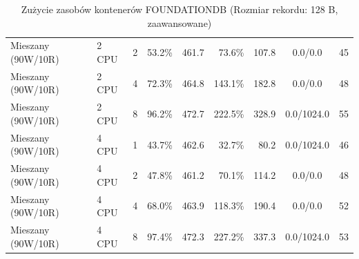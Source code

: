 \begin{table}[ht]
{\begin{tabular}{llcrrrrcc}
Mieszany (90W/10R) & 2 CPU & 2 & 53.2\% & 461.7 & 73.6\% & 107.8 & 0.0/0.0 & 45 \\
Mieszany (90W/10R) & 2 CPU & 4 & 72.3\% & 464.8 & 143.1\% & 182.8 & 0.0/0.0 & 48 \\
Mieszany (90W/10R) & 2 CPU & 8 & 96.2\% & 472.7 & 222.5\% & 328.9 & 0.0/1024.0 & 55 \\
Mieszany (90W/10R) & 4 CPU & 1 & 43.7\% & 462.6 & 32.7\% & 80.2 & 0.0/1024.0 & 46 \\
Mieszany (90W/10R) & 4 CPU & 2 & 47.8\% & 461.2 & 70.1\% & 114.2 & 0.0/0.0 & 48 \\
Mieszany (90W/10R) & 4 CPU & 4 & 68.0\% & 463.9 & 118.3\% & 190.4 & 0.0/0.0 & 52 \\
Mieszany (90W/10R) & 4 CPU & 8 & 97.4\% & 472.3 & 227.2\% & 337.3 & 0.0/1024.0 & 53 \\
\bottomrule
\end{tabular}%
}
\caption{Zużycie zasobów kontenerów FOUNDATIONDB (Rozmiar rekordu: 128 B, zaawansowane)}
\label{tab:resources_foundationdb_small_0}
\end{table}
